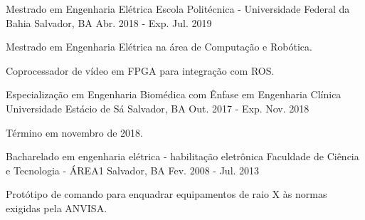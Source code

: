 

\begin{cventries}

  \cventry
    {Mestrado em Engenharia Elétrica} %
    {Escola Politécnica - Universidade Federal da Bahia} %
    {Salvador, BA} %
    {Abr. 2018 - Exp. Jul. 2019} %
    {
      \begin{cvitems} %
        \item {Mestrado em Engenharia Elétrica na área de Computação e Robótica.}
        \item {Coprocessador de vídeo em FPGA para integração com ROS.}
      \end{cvitems}
    }


  \cventry
    {Especialização em Engenharia Biomédica com Ênfase em Engenharia Clínica} %
    {Universidade Estácio de Sá} %
    {Salvador, BA} %
    {Out. 2017 - Exp. Nov. 2018} %
    {
      \begin{cvitems} %
        \item {Término em novembro de 2018.}
      \end{cvitems}
    }


  \cventry
    {Bacharelado em engenharia elétrica - habilitação eletrônica} %
    {Faculdade de Ciência e Tecnologia - ÁREA1} %
    {Salvador, BA} %
    {Fev. 2008 - Jul. 2013} %
    {
      \begin{cvitems} %
        \item {Protótipo de comando para enquadrar equipamentos de raio X às normas exigidas pela ANVISA.}
      \end{cvitems}
    }


\end{cventries}
